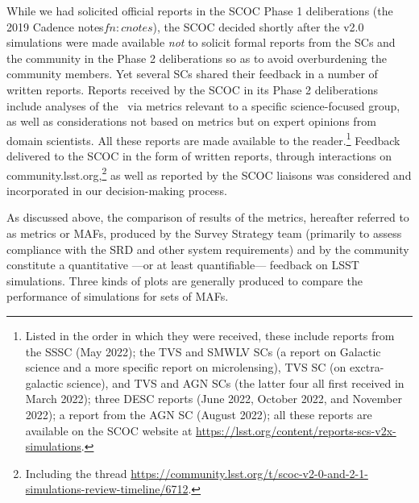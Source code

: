 While we had solicited official reports in the SCOC Phase 1 deliberations (the 2019 Cadence notes${fn:cnotes}$),
the SCOC decided shortly after the v2.0 simulations were made available {\it not} to solicit formal reports from the SCs and the community in the Phase 2 deliberations so as to avoid overburdening the community members. Yet several SCs shared their feedback in a number of written reports. Reports received by the SCOC in its Phase 2 deliberations include analyses of the \opsim\ via metrics relevant to a specific science-focused group, as well as  considerations not based on metrics but on expert opinions from domain scientists. All these reports are made available to the reader.\footnote{Listed in the order in which they were received, these include reports from the
SSSC (May 2022);
the TVS and SMWLV SCs (a report on Galactic science and a more specific report on microlensing), TVS SC (on exctra-galactic science), and TVS and AGN SCs (the latter four all first received in March 2022); three 
DESC reports (June 2022, October 2022, and November 2022); a report from the AGN SC (August 2022); all these reports are available on the SCOC website at \url{https://lsst.org/content/reports-scs-v2x-simulations}.} Feedback delivered to the SCOC in the form of written reports, through interactions on community.lsst.org,\footnote{Including the thread \url{https://community.lsst.org/t/scoc-v2-0-and-2-1-simulations-review-timeline/6712}.} as well as reported by the SCOC liaisons was considered and incorporated in our decision-making process. 


As discussed above, the comparison of results of the metrics, hereafter referred to as metrics or MAFs, produced by the Survey Strategy team (primarily to assess compliance with the SRD and other system requirements) and by the community constitute a quantitative ---or at least quantifiable--- feedback on LSST simulations. Three kinds of plots are generally produced to compare the performance of simulations for sets of MAFs.

